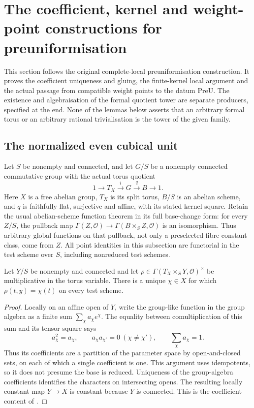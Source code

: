 \section{The coefficient, kernel and weight-point constructions for preuniformisation}
\label{sec:faithful-preuniformisation}
This section follows the original complete-local preuniformisation
construction.  It proves the coefficient uniqueness and gluing,
the finite-kernel local argument and the actual passage from compatible
weight points to the datum \(\mathrm{PreU}\).
The existence and algebraisation of the formal quotient tower are
separate producers, specified at the end.  None of the lemmas below
asserts that an arbitrary formal torus or an arbitrary rational
trivialisation is the tower of the given family.

\subsection{The normalized even cubical unit}
Let \(S\) be nonempty and connected, and let \(G/S\) be a nonempty
connected commutative group
with the actual torus quotient
\[
       1\longrightarrow T_X\xrightarrow{i}G\xrightarrow{q}B
                      \longrightarrow1.
 \tag{PUF1}\label{eq:preunif-torus-extension}
\]
Here \(X\) is a free abelian group, \(T_X\) is its split torus,
\(B/S\) is an abelian scheme, and \(q\) is faithfully flat, surjective
and affine, with its stated kernel square.
Retain the usual abelian-scheme function theorem in its full
base-change form: for every \(Z/S\), the pullback map
\(\Gamma(Z,\mathcal O)\to\Gamma(B\times_S Z,\mathcal O)\)
is an isomorphism. Thus arbitrary global functions on that
pullback, not only a preselected fibre-constant class, come from \(Z\).
All point identities in this subsection are functorial in the test
scheme over \(S\), including nonreduced test schemes.

\begin{srlemma}
\label{lem:preunif-character-family}
Let \(Y/S\) be nonempty and connected and let
\(\rho\in\Gamma(T_X\times_S Y,\mathcal O)^\times\) be multiplicative
in the torus variable.  There is a unique \(\chi\in X\) for which
\(\rho(t,y)=\chi(t)\) on every test scheme.
\end{srlemma}
\begin{proof}
Locally on an affine open of \(Y\), write the group-like function in
the group algebra as a finite sum \(\sum_\chi a_\chi e^\chi\).
The equality between comultiplication of this sum and its tensor
square says
\[
       a_\chi^2=a_\chi,\qquad
       a_\chi a_{\chi'}=0\ (\chi\ne\chi'),\qquad
       \sum_\chi a_\chi=1.
\]
Thus its coefficients are a partition of the parameter space by
open-and-closed sets, on each of which a single coefficient is one.
This argument uses idempotents, so it does not presume the base is
reduced.  Uniqueness of the group-algebra coefficients identifies the
characters on intersecting opens.  The resulting locally constant
map \(Y\to X\) is constant because \(Y\) is connected.
This is the coefficient content of
.
\end{proof}

